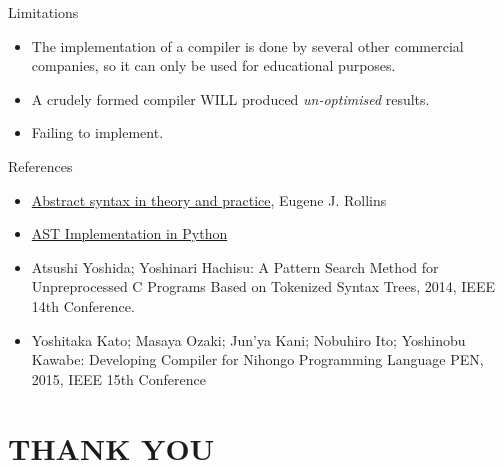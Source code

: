 \documentclass[dvipsnames]{beamer}
\begin{document}
\begin{frame}{Limitations}
\begin{itemize}
\item The implementation of a compiler is done by several other commercial companies, so it can only be used for educational purposes.
\item A crudely formed compiler \alert{WILL} produced \emph{un-optimised} results.
\item Failing to implement.
\end{itemize}
\end{frame}

\begin{frame} {References}
\begin{itemize}
\item \href{http://digitalcommons.ohsu.edu/cgi/viewcontent.cgi?article=1122&context=csetech}{Abstract syntax in theory and practice}, Eugene J. Rollins
\item \href{http://www.jmodelica.org/api-docs/usersguide/1.6.0/ch11s01.html}{AST Implementation in Python}
\item  Atsushi Yoshida; Yoshinari Hachisu: A Pattern Search Method for Unpreprocessed C Programs Based on Tokenized Syntax Trees, 2014, IEEE 14th Conference.
\item Yoshitaka Kato; Masaya Ozaki; Jun'ya Kani; Nobuhiro Ito; Yoshinobu Kawabe: Developing Compiler for Nihongo Programming Language PEN, 2015, IEEE 15th Conference
\end{itemize}
\end{frame}

\section{THANK YOU}
\end{document}
